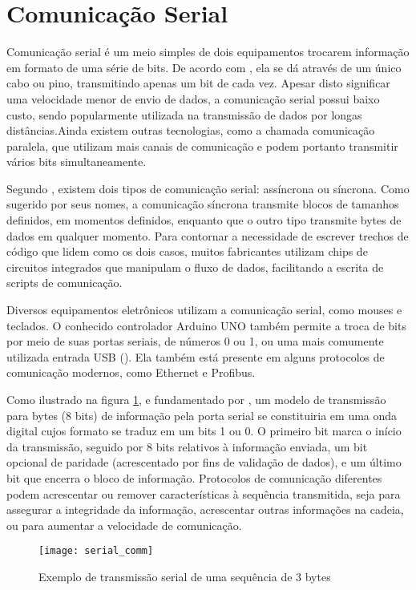 \section{Comunicação Serial}

Comunicação serial é um meio simples de dois equipamentos trocarem informação em formato de uma série de bits. De acordo com \cite{Bolton2015}, ela se dá através de um único cabo ou pino, transmitindo apenas um bit de cada vez. Apesar disto significar uma velocidade menor de envio de dados, a comunicação serial possui baixo custo, sendo popularmente utilizada na transmissão de dados por longas distâncias.Ainda existem outras tecnologias, como a chamada comunicação paralela, que utilizam mais canais de comunicação e podem portanto transmitir vários bits simultaneamente.

Segundo \cite{Mazidi2016}, existem dois tipos de comunicação serial: assíncrona ou síncrona. Como sugerido por seus nomes, a comunicação síncrona transmite blocos de tamanhos definidos, em momentos definidos, enquanto que o outro tipo transmite bytes de dados em qualquer momento. Para contornar a necessidade de escrever trechos de código que lidem como os dois casos, muitos fabricantes utilizam chips de circuitos integrados que manipulam o fluxo de dados, facilitando a escrita de scripts de comunicação.

Diversos equipamentos eletrônicos utilizam a comunicação serial, como mouses e teclados. O conhecido controlador Arduino UNO também permite a troca de bits por meio de suas portas seriais, de números 0 ou 1, ou uma mais comumente utilizada entrada USB (\cite{ArduinoSerial}). Ela também está presente em alguns protocolos de comunicação modernos, como Ethernet e Profibus.

Como ilustrado na figura \ref{img_serial_comm}, e fundamentado por \cite{Mazidi2016}, um modelo de transmissão para bytes (8 bits) de informação pela porta serial se constituiria em uma onda digital cujos formato se traduz em um bits 1 ou 0. O primeiro bit marca o início da transmissão, seguido por 8 bits relativos à informação enviada, um bit opcional de paridade (acrescentado por fins de validação de dados), e um último bit que encerra o bloco de informação. Protocolos de comunicação diferentes podem acrescentar ou remover características à sequência transmitida, seja para assegurar a integridade da informação, acrescentar outras informações na cadeia, ou para aumentar a velocidade de comunicação.

\begin{figure}[hbt]
	\centering
	\texttt{[image: serial\_comm]}
	\caption[Fonte: http://electrosofts.com/parallel/]{Exemplo de transmissão serial de uma sequência de 3 bytes}
	\label{img_serial_comm}
\end{figure}

